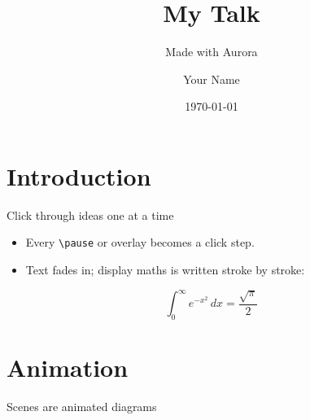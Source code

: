 \documentclass{beamer}
\title{My Talk}
\subtitle{Made with Aurora}
\author{Your Name}
\date{\today}
\begin{document}
\begin{frame}
  \titlepage
\end{frame}

\section{Introduction}

\begin{frame}{Click through ideas one at a time}
  \begin{itemize}[<+->]
    \item Every \texttt{\textbackslash pause} or overlay becomes a click step.
    \item Text fades in; display maths is \alert{written} stroke by stroke:
  \end{itemize}
  \pause
  \[ \int_0^\infty e^{-x^2}\,dx = \frac{\sqrt{\pi}}{2} \]
\end{frame}

\section{Animation}

\begin{frame}{Scenes are animated diagrams}
\begin{scene}[size={14,5.5}]
  \Axes[id=ax, w=9, h=4, x={0,10,1}, y={-1.2,1.2,0.6}]
  \ValueTracker[id=k, value=1]
  \pause
  \pause
  \Animate[k=3, run=2]
\end{scene}
\end{frame}
\end{document}
